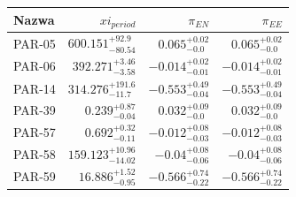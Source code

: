 \documentclass{beamer}
\begin{document}
\begin{frame}
    \begin{tabularx}{\linewidth}{X r r r}
        \toprule
        Nazwa & $xi_{period}$                 & $\pi_{EN}$                 & $\pi_{EE}$                 \\
        \midrule
        PAR-05               & $600.151_{-80.54 } ^{+92.9}$  & $0.065_{-0.0 } ^{+0.02}$   & $0.065_{-0.0 } ^{+0.02}$   \\
        PAR-06               & $392.271_{-3.58 } ^{+3.46}$   & $-0.014_{-0.01 } ^{+0.02}$ & $-0.014_{-0.01 } ^{+0.02}$ \\
        PAR-14               & $314.276_{-11.7 } ^{+191.6}$  & $-0.553_{-0.04 } ^{+0.49}$ & $-0.553_{-0.04 } ^{+0.49}$ \\
        PAR-39               & $0.239_{-0.04 } ^{+0.87}$     & $0.032_{-0.0 } ^{+0.09}$   & $0.032_{-0.0 } ^{+0.09}$   \\
        PAR-57               & $0.692_{-0.11 } ^{+0.32}$     & $-0.012_{-0.03 } ^{+0.08}$ & $-0.012_{-0.03 } ^{+0.08}$ \\
        PAR-58               & $159.123_{-14.02 } ^{+10.96}$ & $-0.04_{-0.06 } ^{+0.08}$  & $-0.04_{-0.06 } ^{+0.08}$  \\
        PAR-59               & $16.886_{-0.95 } ^{+1.52}$    & $-0.566_{-0.22 } ^{+0.74}$ & $-0.566_{-0.22 } ^{+0.74}$ \\
        \bottomrule
    \end{tabularx}
\end{frame}
\end{document}
